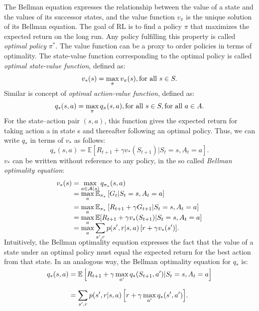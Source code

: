 The Bellman equation expresses the relationship between the value of a state and the values of its successor states, and the value function $v_\pi$ is the unique solution of its Bellman equation.
The goal of RL is to find a policy $\pi$ that maximizes the expected return on the long run. Any policy fulfilling this property is called \textit{optimal policy} $\pi^*$. The value function can be a proxy to order policies in terms of optimality. The state-value function corresponding to the optimal policy is called \textit{optimal state-value function}, defined as: \begin{equation}v_*(s)=\smash{\displaystyle\max_{\pi} v_\pi(s)}, \text{for all } s \in S. \label{eqn:statevaluef}\end{equation}
Similar is concept of \textit{optimal action-value function}, defined as: \begin{equation}q_*(s,a)=\smash{\displaystyle\max_{\pi} q_\pi(s,a)}, \text{for all } s \in S, \text{for all }a \in A.\label{optimal-action-valuef}\end{equation}
For the state–action pair $(s, a)$, this function gives the expected return for taking action a in state s and thereafter following an optimal policy. Thus, we can write $q_*$ in terms of $v_*$ as follows:
\begin{equation}q_*(s,a)=\mathbb{E}\left[R_{t+1} + \gamma v_*(S_{t+1})|S_t=s,A_t=a\right].\label{eqn:vcomeq}\end{equation}
$v_*$ can be written without reference to any policy, in the so called \textit{Bellman optimality equation}:
\begin{align}
v_*(s) &=\smash{\displaystyle \max_{a\in \mathcal{A}(s)} q_{\pi_*}(s,a) }\nonumber \\ 
&= \max_a \mathbb{E}_{\pi_*}\left[G_t|S_t=s,A_t=a\right] \nonumber \\ 
&=\smash{\displaystyle \max_a \mathbb{E}_{\pi_*}\left[R_{t+1}+\gamma G_{t+1}|S_t=s,A_t=a\right]} \nonumber \\ 
&=\smash{\displaystyle \max_a \mathbb{E}[R_{t+1}+\gamma v_* (S_{t+1})|S_t=s,A_t=a]} \nonumber \\ 
&=\smash{\displaystyle \max_a\sum_{s',r}p(s',r|s,a)\left[r+\gamma v_*(s')\right]}.
\end{align}
Intuitively, the Bellman optimality equation expresses the fact that the value of a state under an optimal policy must equal the expected return for the best action from that state.
In an analogous way, the Bellman optimality equation for $q_*$ is:
\begin{align}
 q_*(s,a) &= \smash{\displaystyle \mathbb{E}\left[R_{t+1}+\gamma \max_{a'}q_*(S_{t+1},a')|S_t=s,A_t=a\right]} \nonumber \\ \nonumber \\
&=\smash{\displaystyle \sum_{s',r}p(s',r|s,a)\left[r+\gamma \max_{a'}q_*(s',a')\right]}.
\end{align}


